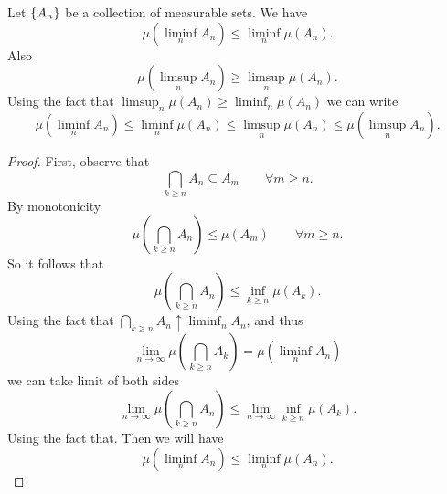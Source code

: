 \begin{proposition}
	Let $ \{A_n\} $ be a collection of measurable sets. We have
	\[ \mu(\liminf_n A_n) \leq \liminf_n \mu(A_n). \]
	Also
	\[ \mu(\limsup_n A_n) \geq \limsup_n \mu(A_n). \]
	Using the fact that $ \limsup_n \mu(A_n) \geq \liminf_n \mu(A_n) $ we can write
	\[ \mu(\liminf_n A_n) \leq \liminf_n \mu(A_n) \leq \limsup_n \mu(A_n) \leq \mu(\limsup_n A_n). \]
\end{proposition}
\begin{proof}
	First, observe that
	\[ \bigcap_{k\geq n} A_n \subseteq A_m \qquad \forall m\geq n. \]
	By monotonicity
	\[ \mu(\bigcap_{k\geq n} A_n) \leq \mu (A_m) \qquad \forall m \geq n. \]
	So it follows that 
	\[ \mu(\bigcap_{k\geq n} A_n) \leq \inf_{k\geq n}\mu(A_k).  \]
	Using the fact that $ \bigcap_{k\geq n} A_n \uparrow \liminf_n A_n $, and thus 
	\[\lim_{n\to\infty} \mu(\bigcap_{k\geq n} A_k) = \mu(\liminf_n A_n) \]
	we can take limit of both sides
	\[ \lim_{n\to\infty} \mu(\bigcap_{k\geq n}A_n) \leq \lim_{n\to\infty }\inf_{k\geq n} \mu(A_k). \]
	Using the fact that. Then we will have
	\[ \mu(\liminf_n A_n) \leq \liminf_n \mu(A_n). \]
\end{proof}


